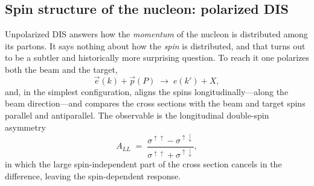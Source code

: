 \FloatBarrier

\subsection{Spin structure of the nucleon: polarized DIS}
\label{subsec:polarized-dis}

Unpolarized DIS answers how the \emph{momentum} of the nucleon is distributed among its
partons. It says nothing about how the \emph{spin} is distributed, and that turns out to
be a subtler and historically more surprising question. To reach it one polarizes both
the beam and the target,
\begin{equation}
    \vec e(k) + \vec p(P) \;\rightarrow\; e(k') + X,
\end{equation}
and, in the simplest configuration, aligns the spins longitudinally---along the beam
direction---and compares the cross sections with the beam and target spins parallel and
antiparallel. The observable is the longitudinal double-spin asymmetry
\begin{equation}
    A_{LL} \;=\; \frac{\sigma^{\uparrow\uparrow} - \sigma^{\uparrow\downarrow}}
                       {\sigma^{\uparrow\uparrow} + \sigma^{\uparrow\downarrow}},
    \label{eq:ALL}
\end{equation}
in which the large spin-independent part of the cross section cancels in the difference,
leaving the spin-dependent response.

